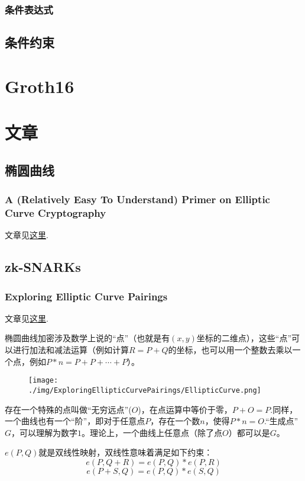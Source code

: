 \documentclass[10pt]{ctexart}
\begin{document}
\subsubsection{条件表达式}

\subsection{条件约束}

\section{Groth16}
\section{文章}
\subsection{椭圆曲线}
\subsubsection{A (Relatively Easy To Understand) Primer on Elliptic Curve Cryptography}
文章见\href{https://blog.cloudflare.com/a-relatively-easy-to-understand-primer-on-elliptic-curve-cryptography/}{这里}.
\subsection{zk-SNARKs}
\subsubsection{Exploring Elliptic Curve Pairings}
文章见\href{https://medium.com/@VitalikButerin/exploring-elliptic-curve-pairings-c73c1864e627}{这里}.

椭圆曲线加密涉及数学上说的“点”（也就是有$(x,y)$坐标的二维点），这些“点”可以进行加法和减法运算（例如计算$R=P+Q$的坐标，也可以用一个整数去乘以一个点，例如$P * n = P + P + \cdots + P$）。
\begin{figure}[H]
    \centering
    \texttt{[image: ./img/ExploringEllipticCurvePairings/EllipticCurve.png]} 
\end{figure}
存在一个特殊的点叫做“无穷远点”($O$)，在点运算中等价于零，$P + O = P$.同样，一个曲线也有一个“阶”，即对于任意点$P$，存在一个数$n$，使得$P * n = O$.“生成点”$G$，可以理解为数字$1$。理论上，一个曲线上任意点（除了点$O$）都可以是$G$。

$e(P,Q)$就是双线性映射，双线性意味着满足如下约束：
$$
e(P,Q+R)=e(P,Q) * e(P,R) 
$$
$$
e(P+S,Q) = e(P,Q) * e(S,Q)
$$
\end{document}
